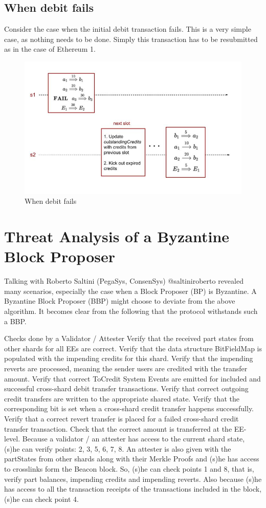 \documentclass{article}
\begin{document}
\subsection{When debit fails}
Consider the case when the initial debit transaction fails. This is a very simple case, as nothing needs to be done. Simply this transaction has to be resubmitted as in the case of Ethereum 1.

\begin{figure}[h]
	\includegraphics[scale=0.4]{Debit.jpg}
	\caption{When debit fails\label{fig:debit}}
\end{figure}

\section{Threat Analysis of a Byzantine Block Proposer}
\label{sec:threat}
Talking with Roberto Saltini (PegaSys, ConsenSys) @saltiniroberto revealed many scenarios, especially the case when a Block Proposer (BP) is Byzantine. A Byzantine Block Proposer (BBP) might choose to deviate from the above algorithm. It becomes clear from the following that the protocol withstands such a BBP.

Checks done by a Validator / Attester
Verify that the received part states from other shards for all EEs are correct.
Verify that the data structure BitFieldMap is populated with the impending credits for this shard.
Verify that the impending reverts are processed, meaning the sender users are credited with the transfer amount.
Verify that correct ToCredit System Events are emitted for included and successful cross-shard debit transfer transactions.
Verify that correct outgoing credit transfers are written to the appropriate shared state.
Verify that the corresponding bit is set when a cross-shard credit transfer happens successfully.
Verify that a correct revert transfer is placed for a failed cross-shard credit transfer transaction.
Check that the correct amount is transferred at the EE-level.
Because a validator / an attester has access to the current shard state, (s)he can verify points: 2, 3, 5, 6, 7, 8. An attester is also given with the partStates from other shards along with their Merkle Proofs and (s)he has access to crosslinks form the Beacon block. So, (s)he can check points 1 and 8, that is, verify part balances, impending credits and impending reverts. Also because (s)he has access to all the transaction receipts of the transactions included in the block, (s)he can check point 4.
\end{document}
